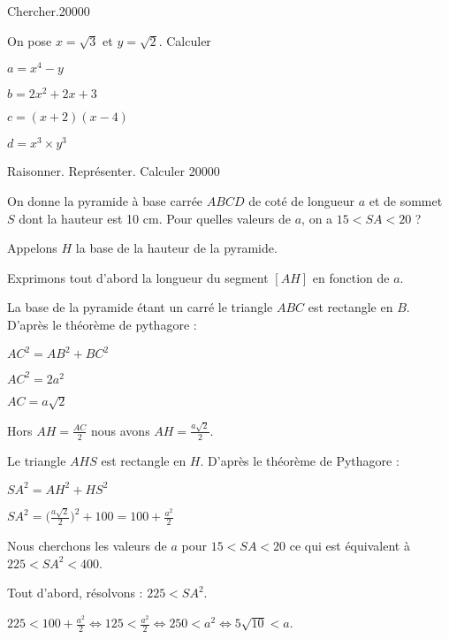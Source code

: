 \begin{pageParcourst} %
 
 
 \begin{ExoCtN}{Chercher.}{2}{0}{0}{0}{0}

On pose $x = \sqrt{3}$ et $y=\sqrt{2}$. Calculer

\begin{enumerate}
\begin{minipage}{0.5\linewidth}
\item $a= x^4-y$
\item $b=2x^2+2x+3$
\end{minipage}
\begin{minipage}{0.5\linewidth}
\item $c=(x+2)(x-4)$
\item $d=x^3 \times y^3$
\end{minipage}
\end{enumerate}
\end{ExoCtN}


 
\begin{ExoCtN}{Raisonner. Représenter. Calculer }{2}{0}{0}{0}{0}
 
On donne la pyramide à base carrée $ABCD$ de coté de longueur $a$ et de sommet $S$ dont la hauteur est 10 cm.
Pour quelles valeurs de $a$, on a $15 < SA < 20$ ?

Appelons $H$ la base de la hauteur de la pyramide.

Exprimons tout d'abord la longueur du segment $[AH]$ en fonction de $a$.

La base de la pyramide étant un carré le triangle $ABC$ est rectangle en $B$. D'après le théorème de pythagore :

$AC^2=AB^2+BC^2$

$AC^2=2a^2$

$AC=a\sqrt{2}$

Hors $AH=\frac{AC}{2}$ nous avons $AH=\frac{a\sqrt{2}}{2}$.

Le triangle $AHS$ est rectangle en $H$. D'après le théorème de Pythagore :

$SA^2=AH^2+HS^2$

$SA^2=\big(\frac{a\sqrt{2}}{2}\big)^2+100=100+\frac{a^2}{2}$

Nous cherchons les valeurs de $a$ pour $15<SA<20$ ce qui est équivalent à $225<SA^2<400$.

Tout d'abord, résolvons : $225<SA^2$.

$225<100+\frac{a^2}{2}\Leftrightarrow 125<\frac{a^2}{2}\Leftrightarrow 250<a^2\Leftrightarrow 5\sqrt{10}<a$.


\end{ExoCtN}
\end{pageParcourst}
